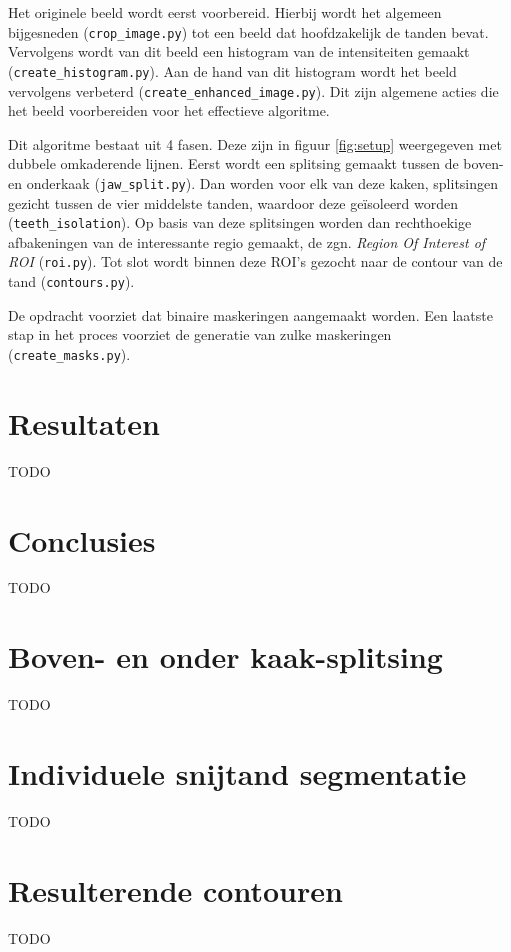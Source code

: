 \documentclass[10pt,a4paper]{article}
\begin{document}
Het originele beeld wordt eerst voorbereid. Hierbij wordt het algemeen bijgesneden ({\tt crop\_image.py}) tot een beeld dat hoofdzakelijk de tanden bevat. Vervolgens wordt van dit beeld een histogram van de intensiteiten gemaakt ({\tt create\_histogram.py}). Aan de hand van dit histogram wordt het beeld vervolgens verbeterd ({\tt create\_enhanced\_image.py}). Dit zijn algemene acties die het beeld voorbereiden voor het effectieve algoritme.

Dit algoritme bestaat uit 4 fasen. Deze zijn in figuur \ref{fig:setup} weergegeven met dubbele omkaderende lijnen. Eerst wordt een splitsing gemaakt tussen de boven- en onderkaak ({\tt jaw\_split.py}). Dan worden voor elk van deze kaken, splitsingen gezicht tussen de vier middelste tanden, waardoor deze ge\"isoleerd worden ({\tt teeth\_isolation}). Op basis van deze splitsingen worden dan rechthoekige afbakeningen van de interessante regio gemaakt, de zgn. \emph{Region Of Interest of ROI} ({\tt roi.py}). Tot slot wordt binnen deze ROI's gezocht naar de contour van de tand ({\tt contours.py}).

De opdracht voorziet dat binaire maskeringen aangemaakt worden. Een laatste stap in het proces voorziet de generatie van zulke maskeringen ({\tt create\_masks.py}).

\section{Resultaten}

TODO

\section{Conclusies}

TODO

\appendix

\section{Boven- en onder kaak-splitsing}
\label{appendix:jaw-split}

TODO

\section{Individuele snijtand segmentatie}
\label{appendix:teeth-segmentation}

TODO

\section{Resulterende contouren}
\label{appendix:contours}

TODO
\end{document}
